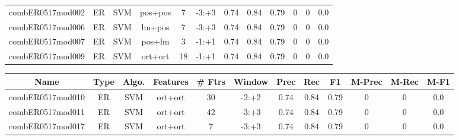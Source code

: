\documentclass[a4paper]{article}
\begin{document}
\begin{landscape}
\begin{center}
\begin{tabular}{ |c|c|c|c|c|c|c|c|c|c|c|c|}
 	
 
 	
 		
 		\small{ combER0517mod002 } & ER & SVM & pos+pos  &  7 &  -3:+3  &  0.74 & 0.84 & 0.79  &  0 & 0 & 0.0 \\
 		

 	
 
 	
 		
 		\small{ combER0517mod006 } & ER & SVM & lm+pos  &  7 &  -3:+3  &  0.74 & 0.84 & 0.79  &  0 & 0 & 0.0 \\
 		

 	
 
 	
 		
 		\small{ combER0517mod007 } & ER & SVM & pos+lm  &  3 &  -1:+1  &  0.74 & 0.84 & 0.79  &  0 & 0 & 0.0 \\
 		

 	
 
 	
 		
 		\small{ combER0517mod009 } & ER & SVM & ort+ort  &  18 &  -1:+1  &  0.74 & 0.84 & 0.79  &  0 & 0 & 0.0 \\
 		
 \hline
\end{tabular}
\end{center}




\begin{center}
\begin{tabular}{ |c|c|c|c|c|c|c|c|c|c|c|c|} 
 \hline
 	Name & Type & Algo. & Features & \# Ftrs & Window & Prec & Rec & F1 & M-Prec & M-Rec & M-F1\\
 \hline

 		

 	
 
 	
 		
 		\small{ combER0517mod010 } & ER & SVM & ort+ort  &  30 &  -2:+2  &  0.74 & 0.84 & 0.79  &  0 & 0 & 0.0 \\
 		

 	
 
 	
 		
 		\small{ combER0517mod011 } & ER & SVM & ort+ort  &  42 &  -3:+3  &  0.74 & 0.84 & 0.79  &  0 & 0 & 0.0 \\
 		

 	
 
 	
 		
 		\small{ combER0517mod017 } & ER & SVM & ort+ort  &  7 &  -3:+3  &  0.74 & 0.84 & 0.79  &  0 & 0 & 0.0 \\
 		

 	
 

\end{tabular}
\end{center}
\end{landscape}
\end{document}
